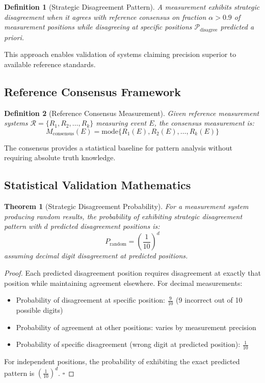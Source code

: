 \documentclass[12pt,a4paper]{article}
\newtheorem{theorem}{Theorem}
\newtheorem{definition}{Definition}
\begin{document}
\begin{definition}[Strategic Disagreement Pattern]
A measurement exhibits strategic disagreement when it agrees with reference consensus on fraction $\alpha > 0.9$ of measurement positions while disagreeing at specific positions $\mathcal{P}_{\text{disagree}}$ predicted a priori.
\end{definition}

This approach enables validation of systems claiming precision superior to available reference standards.

\subsection{Reference Consensus Framework}

\begin{definition}[Reference Consensus Measurement]
Given reference measurement systems $\mathcal{R} = \{R_1, R_2, \ldots, R_k\}$ measuring event $E$, the consensus measurement is:
$$M_{\text{consensus}}(E) = \text{mode}\{R_1(E), R_2(E), \ldots, R_k(E)\}$$
\end{definition}

The consensus provides a statistical baseline for pattern analysis without requiring absolute truth knowledge.

\subsection{Statistical Validation Mathematics}

\begin{theorem}[Strategic Disagreement Probability]
For a measurement system producing random results, the probability of exhibiting strategic disagreement pattern with $d$ predicted disagreement positions is:
$$P_{\text{random}} = \left(\frac{1}{10}\right)^d$$
assuming decimal digit disagreement at predicted positions.
\end{theorem}

\begin{proof}
Each predicted disagreement position requires disagreement at exactly that position while maintaining agreement elsewhere. For decimal measurements:
\begin{itemize}
\item Probability of disagreement at specific position: $\frac{9}{10}$ (9 incorrect out of 10 possible digits)
\item Probability of agreement at other positions: varies by measurement precision
\item Probability of specific disagreement (wrong digit at predicted position): $\frac{1}{10}$
\end{itemize}

For independent positions, the probability of exhibiting the exact predicted pattern is $\left(\frac{1}{10}\right)^d$. $\square$
\end{proof}
\end{document}
